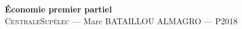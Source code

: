 \documentclass[12pt,oneside,a4paper]{article}
\begin{document}
\begin{center}
{\LARGE \bfseries 
 Économie premier partiel \\[0.3cm] 
}
{\large
  \textsc{CentraleSupélec} --- Marc BATAILLOU ALMAGRO --- P2018\\[0.7cm]
}
\end{center}
  
\tableofcontents{}



\end{document}
